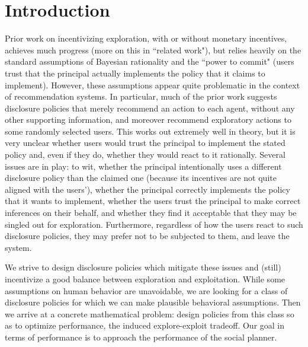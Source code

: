 \section{Introduction}
\label{sec:intro}



 Prior work on incentivizing exploration, with or without monetary incentives, achieves much progress (more on this in ``related work"), but relies heavily on the standard assumptions of Bayesian rationality and the ``power to commit" (\ie users trust that the principal actually implements the policy that it claims to implement). However, these assumptions appear quite problematic in the context of recommendation systems. In particular, much of the prior work suggests disclosure policies that merely recommend an action to each agent, without any other supporting information, and moreover recommend exploratory actions to some randomly selected users. This works out extremely well in theory, but it is very unclear whether users would trust the principal to implement the stated policy and, even if they do, whether they would react to it rationally. Several issues are in play: to wit, whether the principal intentionally uses a different disclosure policy than the claimed one (\eg because its incentives are not quite aligned with the users'), whether the principal correctly implements the policy that it wants to implement, whether the users trust the principal to make correct inferences on their behalf, and whether they find it acceptable that they may be singled out for exploration. Furthermore, regardless of how the users react to such disclosure policies, they may prefer not to be subjected to them, and leave the system.

We strive to design disclosure policies which mitigate these issues and (still) incentivize a good balance between exploration and exploitation. While some assumptions on human behavior are unavoidable, we are looking for a class of disclosure policies for which we can make plausible behavioral assumptions. Then we arrive at a concrete mathematical problem: design policies from this class so as to optimize performance, \ie  the induced explore-exploit tradeoff. Our goal in terms of performance is to approach the performance of the social planner.

